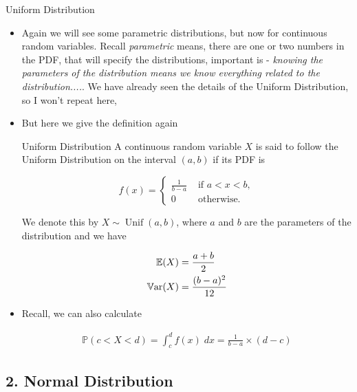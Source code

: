 \documentclass[8pt, usepdftitle = false]{beamer}
\begin{document}
\begin{frame}[allowframebreaks]{Uniform Distribution}

\begin{itemize}

	\item Again we will see some parametric distributions, but now for continuous random variables. Recall \emph{parametric} means, there are one or two numbers in the PDF, that will specify the distributions, important is - \emph{knowing the parameters of the distribution means we know everything related to the distribution....}. We have already seen the details of the Uniform Distribution, so I won't repeat here,


	\item But here we give the definition again

	\framebreak


\begin{varblock}{Uniform Distribution}
A continuous random variable $X$ is said to follow the \alert{Uniform Distribution} on the interval $(a, b)$ if its PDF is

$$
f(x)= \begin{cases}\frac{1}{b-a} & \text { if } a<x<b, \\ 0 & \text { otherwise. }\end{cases}
$$

We denote this by $X \sim \operatorname{Unif}(a, b)$, where $a$ and $b$ are the parameters of the distribution and we have  

\begin{align*}
\mathbb{E}(X) &= \frac{a+b}{2} \\
\mathbb{V}\mathrm{ar}{(}X) &= \frac{(b-a)^2}{12}
\end{align*}

	
\end{varblock}

\medskip

\item Recall, we can also calculate 

		\begin{align*}
			\mathbb{P}(c < X < d) = \int_c^d f(x) \; dx =   \frac{1}{b-a} \times (d - c)
		\end{align*}




\end{itemize}
\end{frame}

\subsection{2. Normal Distribution}
\frame{\subsectionpage}
\end{document}
